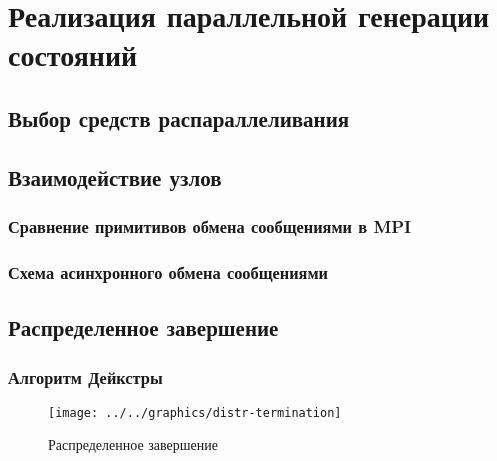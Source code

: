 \chapter{Реализация параллельной генерации состояний}
\label{cha:parmpi}

\section{Выбор средств распараллеливания}
\label{sec:paral-selection}

\section{Взаимодействие узлов}
\label{sec:mpi-interaction}

\subsection{Сравнение примитивов обмена сообщениями в MPI}
\label{sec:mpi-primitives}

\subsection{Схема асинхронного обмена сообщениями}
\label{sec:async-mpi-queue}


\section{Распределенное завершение}
\label{sec:distributed-termination}

\subsection{Алгоритм Дейкстры}
\label{sec:distr-term-dijkstra}

\begin{figure}[ht]
  \centering
  \texttt{[image: ../../graphics/distr-termination]}  
  \caption{Распределенное завершение}
\label{fig:dist-term}
\end{figure}


